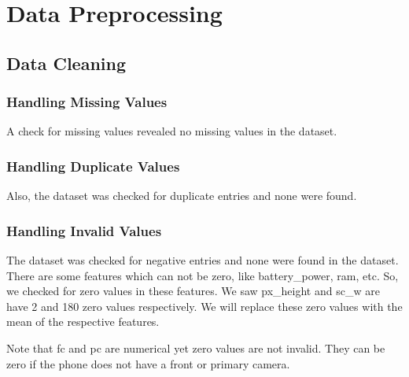 \documentclass[12pt]{report}
\begin{document}
\chapter{Data Preprocessing}
\section{Data Cleaning}
\subsection{Handling Missing Values}
A check for missing values revealed no missing values in the dataset.
\subsection{Handling Duplicate Values}
Also, the dataset was checked for duplicate entries and none were found.
\subsection{Handling Invalid Values}
The dataset was checked for negative entries and none were found in the dataset.
There are some features which can not be zero, like battery\_power, ram, etc. So, we checked for zero values in these features.
We saw px\_height and sc\_w are have 2 and 180 zero values respectively. We will replace these zero values with the mean of the respective features.

Note that fc and pc are numerical yet zero values are not invalid. They can be zero if the phone does not have a front or primary camera.
\end{document}
